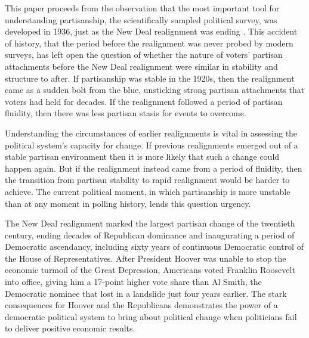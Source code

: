 \documentclass[11pt]{scrartcl}\usepackage[]{graphicx}\usepackage[]{color}
\begin{document}
This paper proceeds from the observation that the most important tool for understanding partisanship, the scientifically sampled political survey, was developed in 1936, just as the New Deal realignment was ending \citep{norpoth2013polls}. This accident of history, that the period before the realignment was never probed by modern surveys, has left open the question of whether the nature of voters' partisan attachments before the New Deal realignment were similar in stability and structure to after. If partisanship was stable in the 1920s, then the realignment came as a sudden bolt from the blue, unsticking strong partisan attachments that voters had held for decades. If the realignment followed a period of partisan fluidity, then there was less partisan stasis for events to overcome. 

Understanding the circumstances of earlier realignments is vital in assessing the political system's capacity for change. If previous realignments emerged out of a stable partisan environment then it is more likely that such a change could happen again.  But if the realignment instead came from a period of fluidity, then the transition from partisan stability to rapid realignment would be harder to achieve.  The current political moment, in which partisanship is more unstable than at any moment in polling history, lends this question urgency.  

The New Deal realignment marked the largest partisan change of the twentieth century, ending decades of Republican dominance and inaugurating a period of Democratic ascendancy, including sixty years of continuous Democratic control of the House of Representatives. After President Hoover was unable to stop the economic turmoil of the Great Depression, Americans voted Franklin Roosevelt into office, giving him a 17-point higher vote share than Al Smith, the Democratic nominee that lost in a landslide just four years earlier. The stark consequences for Hoover and the Republicans demonstrates the power of a democratic political system to bring about political change when politicians fail to deliver positive economic results. 

\end{document}
